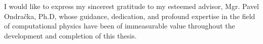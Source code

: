 I would like to express my sincerest gratitude to my esteemed advisor, Mgr.
Pavel Ondračka, Ph.D, whose guidance, dedication, and profound expertise in
the field of computational physics have been of immeasurable value throughout
the development and completion of this thesis.
